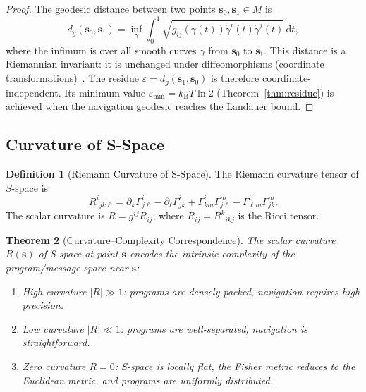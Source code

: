 \documentclass[11pt,twocolumn,a4paper]{article}
\newtheorem{theorem}{Theorem}[section]
\theoremstyle{definition}
\newtheorem{definition}[theorem]{Definition}
\newcommand{\kB}{k_{\mathrm{B}}}
\newcommand{\eps}{\varepsilon}
\newcommand{\dif}{\mathrm{d}}
\begin{document}
\begin{proof}
The geodesic distance between two points $\mathbf{s}_0, \mathbf{s}_1 \in M$ is
\begin{equation}\label{eq:geodesic_distance}
  d_g(\mathbf{s}_0, \mathbf{s}_1) = \inf_\gamma \int_0^1
  \sqrt{g_{ij}(\gamma(t))\dot{\gamma}^i(t)\dot{\gamma}^j(t)} \, \dif t,
\end{equation}
where the infimum is over all smooth curves $\gamma$ from $\mathbf{s}_0$ to $\mathbf{s}_1$.
This distance is a Riemannian invariant: it is unchanged under diffeomorphisms
(coordinate transformations)~\cite{nakahara2003}. The residue
$\eps = d_g(\mathbf{s}_1, \mathbf{s}_0)$ is therefore coordinate-independent. Its minimum
value $\eps_{\min} = \kB T \ln 2$ (Theorem~\ref{thm:residue}) is achieved when the
navigation geodesic reaches the Landauer bound.
\end{proof}

\subsection{Curvature of S-Space}\label{sec:infogeo:curvature}

\begin{definition}[Riemann Curvature of S-Space]\label{def:riemann_curv}
The Riemann curvature tensor of $S$-space is
\begin{equation}\label{eq:riemann}
  R^i{}_{jk\ell} = \partial_k \Gamma^i_{j\ell} - \partial_\ell \Gamma^i_{jk}
  + \Gamma^i_{km}\Gamma^m_{j\ell} - \Gamma^i_{\ell m}\Gamma^m_{jk}.
\end{equation}
The scalar curvature is $R = g^{ij}R_{ij}$, where $R_{ij} = R^k{}_{ikj}$ is the Ricci
tensor.
\end{definition}

\begin{theorem}[Curvature--Complexity Correspondence]\label{thm:curv_complexity}
The scalar curvature $R(\mathbf{s})$ of S-space at point $\mathbf{s}$ encodes the
intrinsic complexity of the program/message space near $\mathbf{s}$:
\begin{enumerate}[label=(\roman*)]
  \item High curvature $|R| \gg 1$: programs are densely packed, navigation requires
        high precision.
  \item Low curvature $|R| \ll 1$: programs are well-separated, navigation is
        straightforward.
  \item Zero curvature $R = 0$: S-space is locally flat, the Fisher metric reduces to the
        Euclidean metric, and programs are uniformly distributed.
\end{enumerate}
\end{theorem}
\end{document}
